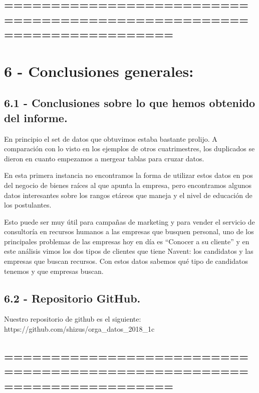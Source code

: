 \documentclass[11pt]{article}
\begin{document}
    \hypertarget{section}{%
\subsection{======================================================================}\label{section}}

    \hypertarget{conclusiones-generales}{%
\section{6 - Conclusiones generales:}\label{conclusiones-generales}}

\hypertarget{conclusiones-sobre-lo-que-hemos-obtenido-del-informe.}{%
\subsection{6.1 - Conclusiones sobre lo que hemos obtenido del
informe.}\label{conclusiones-sobre-lo-que-hemos-obtenido-del-informe.}}

En principio el set de datos que obtuvimos estaba bastante prolijo. A
comparación con lo visto en los ejemplos de otros cuatrimestres, los
duplicados se dieron en cuanto empezamos a mergear tablas para cruzar
datos.

En esta primera instancia no encontramos la forma de utilizar estos
datos en pos del negocio de bienes raíces al que apunta la empresa, pero
encontramos algunos datos interesantes sobre los rangos etáreos que
maneja y el nivel de educación de los postulantes.

Esto puede ser muy útil para campañas de marketing y para vender el
servicio de consultoría en recursos humanos a las empresas que busquen
personal, uno de los principales problemas de las empresas hoy en día es
``Conocer a su cliente'' y en este análisis vimos los dos tipos de
clientes que tiene Navent: los candidatos y las empresas que buscan
recursos. Con estos datos sabemos qué tipo de candidatos tenemos y que
empresas buscan.

\hypertarget{repositorio-github.}{%
\subsection{6.2 - Repositorio GitHub.}\label{repositorio-github.}}

Nuestro repositorio de github es el siguiente:
https://github.com/shizus/orga\_datos\_2018\_1c

\hypertarget{section}{%
\subsection{======================================================================}\label{section}}


    
    
    
    
\end{document}
